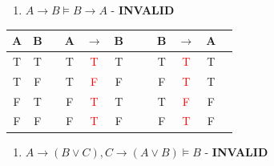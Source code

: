 \documentclass[
  11pt,
]{article}
\providecommand{\tightlist}{%
  \setlength{\itemsep}{0pt}\setlength{\parskip}{0pt}}
\begin{document}
\begin{enumerate}
\def\labelenumi{\arabic{enumi}.}
\setcounter{enumi}{2}
\tightlist
\item
  \(A \rightarrow B \vDash B \rightarrow A\) - \textbf{INVALID}
\end{enumerate}

\begin{tabular}{@{ }c@{ }@{ }c | c@{ }@{ }c@{ }@{ }c@{ }@{ }c@{ }@{ }c | c@{ }@{ }c@{ }@{ }c@{ }@{ }c@{ }@{ }c}
A & B &  & A & $\rightarrow$ & B &  &  & B & $\rightarrow$ & A & \\
\hline 
T & T &  & T & \textcolor{red}{T} & T &  &  & T & \textcolor{red}{T} & T & \\
T & F &  & T & \textcolor{red}{F} & F &  &  & F & \textcolor{red}{T} & T & \\
F & T &  & F & \textcolor{red}{T} & T &  &  & T & \textcolor{red}{F} & F & \\
F & F &  & F & \textcolor{red}{T} & F &  &  & F & \textcolor{red}{T} & F & \\
\end{tabular}

\newpage

\begin{enumerate}
\def\labelenumi{\arabic{enumi}.}
\setcounter{enumi}{3}
\tightlist
\item
  \(A \rightarrow (B \vee C), C \rightarrow (A \vee B) \vDash B\) -
  \textbf{INVALID}
\end{enumerate}
\end{document}
